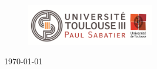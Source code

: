 \begin{titlepage}
\vfill
\begin{figure}[hb]
\centering
\includegraphics[width=0.50\textwidth]{./page_de_garde/logo_ups.png}~\\[1cm]%

\end{figure}
\begin{center}
\large \today
\end{center}

\end{titlepage}
